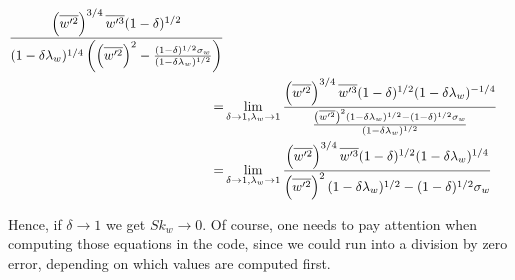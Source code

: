 \begin{align}
    \frac{
        \left(\overline{w'^2}\right)^{3/4} \overline{w'^3} (1-\delta)^{1/2}
    }
    {
        (1-\delta \lambda_w)^{1/4}
        \left(
        \left(\overline{w'^2}\right)^2 -
        \frac{(1-\delta)^{1/2} \sigma_w}{(1-\delta \lambda_w)^{1/2}}
        \right)
    }
    \nonumber\\
    =&\lim_{\delta \to 1, \lambda_w \to 1}
    \frac{
        \left(\overline{w'^2}\right)^{3/4} \overline{w'^3} (1-\delta)^{1/2} (1-\delta \lambda_w)^{-1/4}
    }
    {
        \frac{\left(\overline{w'^2}\right)^2 (1-\delta \lambda_w)^{1/2}
            - (1-\delta)^{1/2} \sigma_w}{(1-\delta \lambda_w)^{1/2}}
    }
    \nonumber\\
    =&\lim_{\delta \to 1, \lambda_w \to 1}
    \frac{
        \left(\overline{w'^2}\right)^{3/4} \overline{w'^3} (1-\delta)^{1/2} (1-\delta \lambda_w)^{1/4}
    }
    {
        \left(\overline{w'^2}\right)^2 (1-\delta \lambda_w)^{1/2}
        - (1-\delta)^{1/2} \sigma_w
    }
\end{align}

Hence, if $\delta \to 1$ we get $Sk_w \to 0$.
Of course, one needs to pay attention when computing those equations in the code,
since we could run into a division by zero error,
depending on which values are computed first.